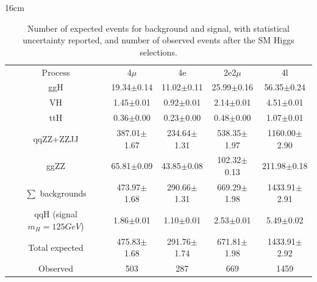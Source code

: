 \begin{table}[hbtp]{16cm}
	\footnotesize
	\caption{Number of expected events for background and signal, with statistical uncertainty reported, and number of observed events after the SM Higgs selections.}
	\centering
	\begin{tabular}{c|c|c|c|c}
		\hline
		\rowcolor{light_gray}
		Process                     & 4$\mu$          & 4e              & 2e2$\mu$        & 4l\\
		ggH                         &  19.34$\pm$0.14 &  11.02$\pm$0.11 &  25.99$\pm$0.16 &   56.35$\pm$0.24\\
		VH                          &   1.45$\pm$0.01 &   0.92$\pm$0.01 &   2.14$\pm$0.01 &    4.51$\pm$0.01\\
		ttH                         &   0.36$\pm$0.00 &   0.23$\pm$0.00 &   0.48$\pm$0.00 &    1.07$\pm$0.01\\
		qqZZ+ZZJJ                   & 387.01$\pm$1.67 & 234.64$\pm$1.31 & 538.35$\pm$1.97 & 1160.00$\pm$2.90\\
		ggZZ                        &  65.81$\pm$0.09 &  43.85$\pm$0.08 & 102.32$\pm$0.13 &  211.98$\pm$0.18\\
		\hline
		$\sum$ backgrounds          & 473.97$\pm$1.68 & 290.66$\pm$1.31 & 669.29$\pm$1.98 & 1433.91$\pm$2.91\\
		\hline
		qqH (signal $m_{H}=125GeV$) &   1.86$\pm$0.01 &   1.10$\pm$0.01 &   2.53$\pm$0.01 &    5.49$\pm$0.02\\
		\hline
		Total expected              & 475.83$\pm$1.68 & 291.76$\pm$1.74 & 671.81$\pm$1.98 & 1433.91$\pm$2.92\\
		\hline
		Observed                    & 503             & 287             & 669             & 1459\\
		\hline
	\end{tabular}
	\label{tab:sm_higgs_yields}
\end{table}

